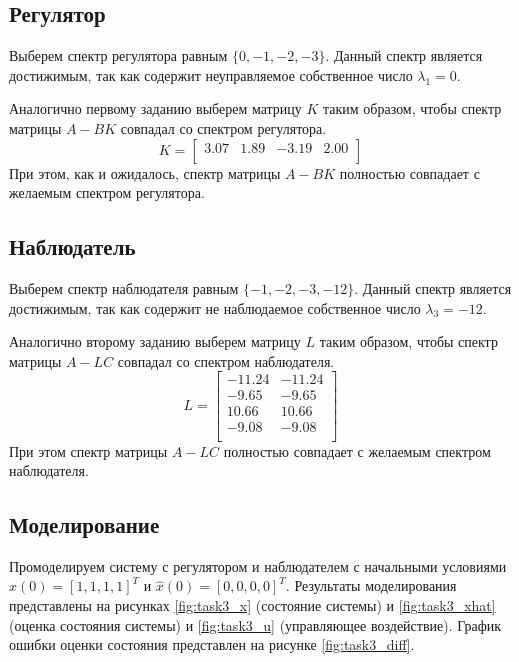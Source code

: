 \subsection{Регулятор}
Выберем спектр регулятора равным $\{0, -1, -2, -3\}$. Данный спектр является достижимым, 
так как содержит неуправляемое собственное число $\lambda_1 = 0$. 

Аналогично первому заданию выберем матрицу $K$ таким образом, чтобы спектр матрицы $A - BK$
совпадал со спектром регулятора.
\begin{equation}
    K = \begin{bmatrix}
        3.07  & 1.89  & -3.19  & 2.00 \\ 
    \end{bmatrix}
\end{equation}
При этом, как и ожидалось, спектр матрицы $A - BK$ полностью совпадает с желаемым спектром регулятора.

\subsection{Наблюдатель}
Выберем спектр наблюдателя равным $\{-1, -2, -3, -12\}$. Данный спектр является достижимым,
так как содержит не наблюдаемое собственное число $\lambda_3 = -12$.

Аналогично второму заданию выберем матрицу $L$ таким образом, чтобы спектр матрицы $A - LC$
совпадал со спектром наблюдателя.
\begin{equation}
    L = \begin{bmatrix}
        -11.24  & -11.24 \\ 
        -9.65  & -9.65 \\ 
        10.66  & 10.66 \\ 
        -9.08  & -9.08 \\ 
    \end{bmatrix}
\end{equation}
При этом спектр матрицы $A - LC$ полностью совпадает с желаемым спектром наблюдателя.

\subsection{Моделирование}
Промоделируем систему с регулятором и наблюдателем с начальными условиями $x(0) = [1, 1, 1, 1]^T$ и $\hat{x}(0) = [0, 0, 0, 0]^T$. 
Результаты моделирования представлены на рисунках \ref{fig:task3_x} (состояние системы) и \ref{fig:task3_xhat} (оценка состояния системы) и 
\ref{fig:task3_u} (управляющее воздействие). График ошибки оценки состояния представлен на рисунке \ref{fig:task3_diff}.

